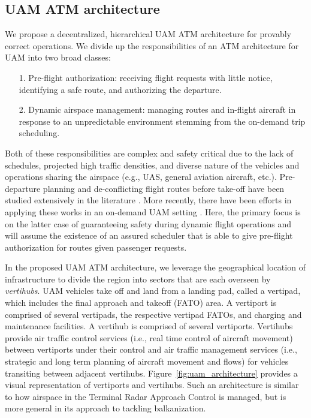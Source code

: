 \subsection{UAM ATM architecture}
We propose a decentralized, hierarchical UAM ATM architecture for provably correct operations. We divide up the responsibilities of an ATM architecture for UAM into two broad classes:
\begin{itemize}
    \item[1.] Pre-flight authorization: receiving flight requests with little notice, identifying a safe route, and authorizing the departure.
\item[2.] Dynamic airspace management: managing routes and in-flight aircraft in response to an unpredictable environment stemming from the on-demand trip scheduling.
\end{itemize}

Both of these responsibilities are complex and safety critical due to the lack of schedules, projected high traffic densities, and diverse nature of the vehicles and operations sharing the airspace (e.g., UAS, general aviation aircraft, etc.). Pre-departure planning and de-conflicting flight routes before take-off have been studied extensively in the literature \cite{6011668,7415976,7934784}. More recently, there have been efforts in applying these works in an on-demand UAM setting \cite{guerreiro2019mission}. Here, the primary focus is on the latter case of guaranteeing safety during dynamic flight operations and will assume the existence of an assured scheduler that is able to give pre-flight authorization for routes given passenger requests. 

In the proposed UAM ATM architecture, we leverage the geographical location of infrastructure to divide the region into sectors that are each overseen by \emph{vertihubs}. UAM vehicles take off and land from a landing pad, called a vertipad, which includes the final approach and takeoff (FATO) area. A vertiport is comprised of several vertipads, the respective vertipad FATOs, and charging and maintenance facilities.  A vertihub is comprised of several vertiports.  Vertihubs provide air traffic control services (i.e., real time control of aircraft movement) between vertiports under their control and air traffic management services (i.e., strategic and long term planning of aircraft movement and flows) for vehicles transiting between adjacent vertihubs.  Figure~\ref{fig:uam_architecture} provides a visual representation of vertiports and vertihubs.  Such an architecture is similar to how airspace in the Terminal Radar Approach Control is managed, but is more general in its approach to tackling balkanization. 


